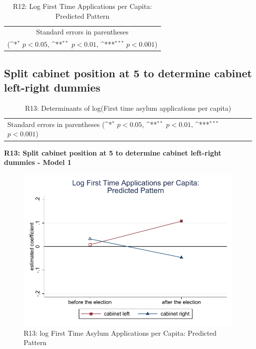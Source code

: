 \documentclass[10pt,a4paper]{scrartcl}
\begin{document}
\begin{table}[!ht]\centering
	\footnotesize
	\renewcommand{\arraystretch}{1.2}
	\def\sym#1{\ifmmode^{#1}\else\(^{#1}\)\fi}
	\caption{R12: Log First Time Applications per Capita: Predicted Pattern}
	\begin{tabular}{l*{2}{c}}
		\hline\hline
		
		\hline\hline
		\multicolumn{3}{c}{\footnotesize Standard errors in parentheses} \\
		\multicolumn{3}{c}{\footnotesize (\sym{*} \(p<0.05\), \sym{**} \(p<0.01\), \sym{***} \(p<0.001\))} \\
	\end{tabular}
\end{table}





\clearpage
\FloatBarrier
\subsection{Split cabinet position at 5 to determine cabinet left-right dummies}
\begin{table}[!ht]\centering
	\renewcommand{\arraystretch}{1.25}
	\small
	\def\sym#1{\ifmmode^{#1}\else\(^{#1}\)\fi}
	\caption{R13: Determinants of log(First time asylum applications per capita)}
	\begin{tabular}{l*{3}{c}}
		\hline\hline
		
		\hline\hline
		\multicolumn{4}{l}{\footnotesize Standard errors in parentheses (\sym{*} \(p<0.05\), \sym{**} \(p<0.01\), \sym{***} \(p<0.001\))}\\
	\end{tabular}
\end{table}

\clearpage
\textbf{R13: Split cabinet position at 5 to determine cabinet left-right dummies - Model 1}
\begin{figure}[!ht]
	\centering
	\includegraphics[width=1\textwidth]{figures_edited/app_graph1_R13.pdf}
	\caption{R13: log First Time Asylum Applications per Capita: Predicted Pattern}
\end{figure}
\end{document}
